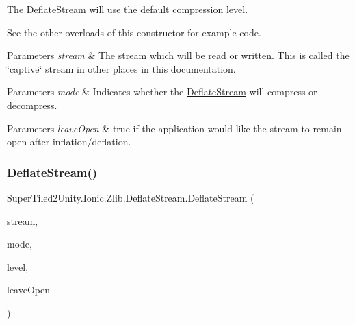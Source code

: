 The {\ttfamily \mbox{\hyperlink{class_super_tiled2_unity_1_1_ionic_1_1_zlib_1_1_deflate_stream}{Deflate\+Stream}}} will use the default compression level. 

See the other overloads of this constructor for example code. 


\begin{DoxyParams}{Parameters}
{\em stream} & The stream which will be read or written. This is called the \char`\"{}captive\char`\"{} stream in other places in this documentation. \\
\hline
\end{DoxyParams}



\begin{DoxyParams}{Parameters}
{\em mode} & Indicates whether the {\ttfamily \mbox{\hyperlink{class_super_tiled2_unity_1_1_ionic_1_1_zlib_1_1_deflate_stream}{Deflate\+Stream}}} will compress or decompress. \\
\hline
\end{DoxyParams}



\begin{DoxyParams}{Parameters}
{\em leave\+Open} & true if the application would like the stream to remain open after inflation/deflation.\\
\hline
\end{DoxyParams}
\mbox{\label{class_super_tiled2_unity_1_1_ionic_1_1_zlib_1_1_deflate_stream_aa6c5b210ece24e5d135767c2f9165090}} 
\subsubsection{\texorpdfstring{Deflate\+Stream()}{DeflateStream()}\hspace{0.1cm}{\footnotesize\ttfamily [4/4]}}
{\footnotesize\ttfamily Super\+Tiled2\+Unity.\+Ionic.\+Zlib.\+Deflate\+Stream.\+Deflate\+Stream (\begin{DoxyParamCaption}\item[{System.\+I\+O.\+Stream}]{stream,  }\item[{\mbox{\hyperlink{namespace_super_tiled2_unity_1_1_ionic_1_1_zlib_ad5b7635d92497e1c905e5de82eb1c6b1}{Compression\+Mode}}}]{mode,  }\item[{\mbox{\hyperlink{namespace_super_tiled2_unity_1_1_ionic_1_1_zlib_a20f6771804996c363f454ad9765cd7db}{Compression\+Level}}}]{level,  }\item[{bool}]{leave\+Open }\end{DoxyParamCaption})}



